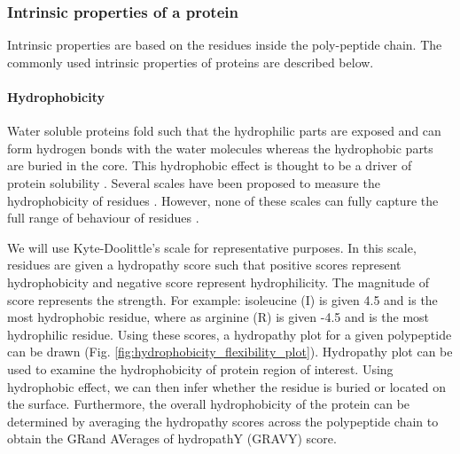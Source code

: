 \subsubsection{Intrinsic properties of a protein}
Intrinsic properties are based on the residues inside the poly-peptide chain. The commonly used intrinsic properties of proteins are described below.

\paragraph{Hydrophobicity}
Water soluble proteins fold such that the hydrophilic parts are exposed and can form hydrogen bonds with the water molecules whereas the hydrophobic parts are buried in the core. This hydrophobic effect is thought to be a driver of protein solubility \cite{tanford1978hydrophobic}. Several scales have been proposed to measure the hydrophobicity of residues \cite{Kyte1982-qn, abraham1987extension, janin1979surface, rose1985hydrophobicity}. However, none of these scales can fully capture the full range of behaviour of residues \cite{charton1982structural}. 


We will use Kyte-Doolittle's scale \cite{Kyte1982-qn} for representative purposes. In this scale, residues are given a hydropathy score such that positive scores represent hydrophobicity and negative score represent hydrophilicity. The magnitude of score represents the strength. For example: isoleucine (I) is given 4.5 and is the most hydrophobic residue, where as  arginine (R) is given -4.5 and is the most hydrophilic residue. Using these scores, a hydropathy plot for a given polypeptide can be drawn (Fig. \ref{fig:hydrophobicity_flexibility_plot}). Hydropathy plot can be used to examine the hydrophobicity of protein region of interest. Using hydrophobic effect, we can then infer whether the residue is buried or located on the surface. Furthermore, the overall hydrophobicity of the protein can be determined by averaging the hydropathy scores across the polypeptide chain to obtain the GRand AVerages of hydropathY (GRAVY) score.


